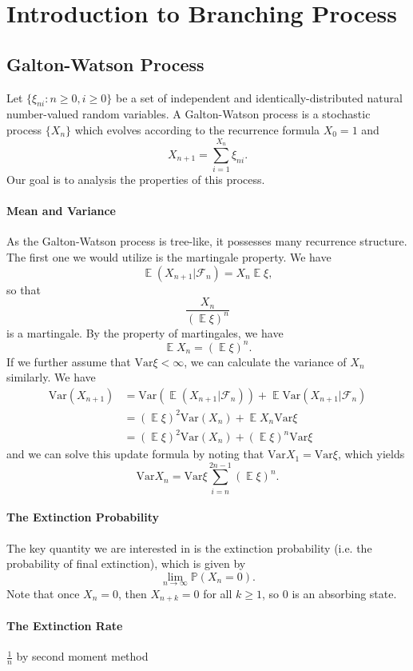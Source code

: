 \documentclass{article}
\theoremstyle{definition}
\newcommand{\EE}{\operatorname{\mathbb{E}}}
\newcommand{\PP}{\mathbb{P}}
\renewcommand{\geq}{\geqslant}
\newcommand{\cF}{\mathcal{F}}
\newcommand{\<}{\left\langle}
\renewcommand{\>}{\right\rangle}
\newcommand{\var}{\text{Var}}
\begin{document}
\section{Introduction to Branching Process}
\subsection{Galton-Watson Process}
Let $\{\xi_{ni}:n\geq 0,i\geq 0\}$ be a set of independent and identically-distributed natural number-valued random variables.
A Galton-Watson process is a stochastic process $\{X_n\}$ which evolves according to the recurrence formula $X_0 = 1$ and 
\[ X_{n+1}=\sum_{i=1}^{X_n}\xi_{ni}.\]
Our goal is to analysis the properties of this process.

\paragraph{Mean and Variance} As the Galton-Watson process is tree-like, it possesses many recurrence structure.
The first one we would utilize is the martingale property. We have 
\[\EE(X_{n+1}|\cF_n)=X_n\EE \xi ,\]
so that \[\frac{X_n}{(\EE \xi)^n}\]
is a martingale. By the property of martingales, we have 
\[\EE X_{n}=(\EE \xi)^n.\]
If we further assume that $\var \xi<\infty$, we can calculate the variance of $X_n$ similarly. 
We have
\begin{align*}
    \var (X_{n+1}) &= \var (\EE(X_{n+1}|\cF_n))+\EE \var(X_{n+1}|\cF_n)\\
    &=(\EE \xi)^2\var(X_n)+\EE X_n \var \xi\\
    &=(\EE \xi)^2\var(X_n)+(\EE \xi)^n \var \xi
\end{align*}
and we can solve this update formula by noting that $\var X_{1}=\var \xi $, which yields
\[\var X_{n}=\var \xi \sum_{i=n}^{2n-1} (\EE \xi)^n.\]

\paragraph{The Extinction Probability} The key quantity we are interested in is the
extinction probability (i.e. the probability of final extinction), which is given by
\[ \lim_{n\to\infty}\PP(X_n=0).\]
Note that once $X_n=0$, then $X_{n+k}=0$ for all $k\geq 1$, so $0$ is an absorbing state.



\paragraph{The Extinction Rate} $\frac{1}{n}$ by second moment method
\end{document}
